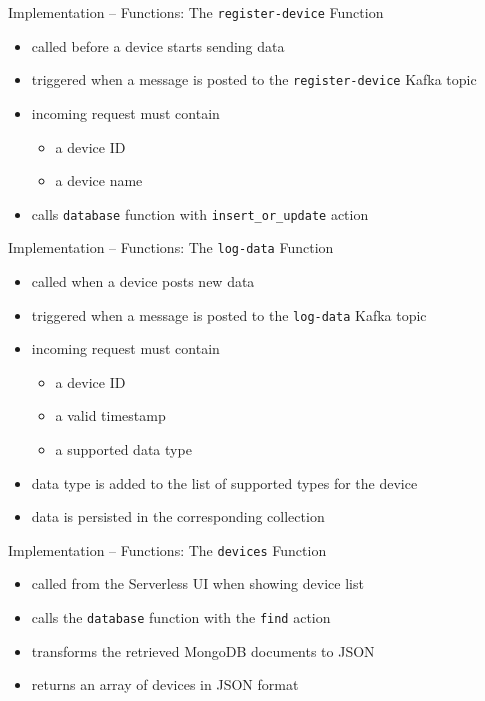 \begin{frame}{Implementation -- Functions: The \texttt{register-device} Function}
  \begin{itemize}
    \item called before a device starts sending data
    \item triggered when a message is posted to the \texttt{register-device} Kafka topic
    \item incoming request must contain
      \begin{itemize}
        \item a device ID
        \item a device name
      \end{itemize}
    \item calls \texttt{database} function with \texttt{insert\_or\_update} action
  \end{itemize}
\end{frame}

\begin{frame}{Implementation -- Functions: The \texttt{log-data} Function}
  \begin{itemize}
    \item called when a device posts new data
    \item triggered when a message is posted to the \texttt{log-data} Kafka topic
    \item incoming request must contain
      \begin{itemize}
        \item a device ID
        \item a valid timestamp
        \item a supported data type
      \end{itemize}
    \item data type is added to the list of supported types for the device
    \item data is persisted in the corresponding collection
  \end{itemize}
\end{frame}

\begin{frame}{Implementation -- Functions: The \texttt{devices} Function}
  \begin{itemize}
    \item called from the Serverless UI when showing device list
    \item calls the \texttt{database} function with the \texttt{find} action
    \item transforms the retrieved MongoDB documents to JSON
    \item returns an array of devices in JSON format
  \end{itemize}
\end{frame}

